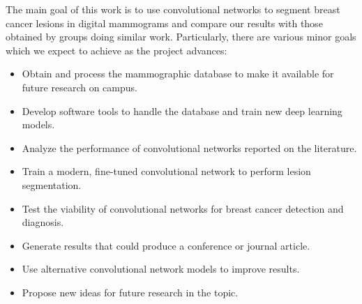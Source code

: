 The main goal of this work is to use convolutional networks to segment breast cancer lesions in digital mammograms and compare our results with those obtained by groups doing similar work.
Particularly, there are various minor goals which we expect to achieve as the project advances:
\begin{itemize}
	\item Obtain and process the mammographic database to make it available for future research on campus.
	\item Develop software tools to handle the database and train new deep learning models.
	\item Analyze the performance of convolutional networks reported on the literature.
	\item Train a modern, fine-tuned convolutional network to perform lesion segmentation.
	\item Test the viability of convolutional networks for breast cancer detection and diagnosis.
	\item Generate results that could produce a conference or journal article.
	\item Use alternative convolutional network models to improve results.
	\item Propose new ideas for future research in the topic.
\end{itemize}
